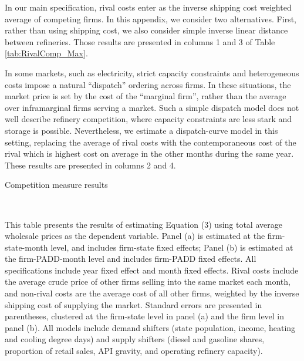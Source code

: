 \documentclass[12pt]{article}
\newcommand{\tablepath}{../output/offline/tables}
\renewcommand{\footnotesize}{\normalsize}
\begin{document}
In our main specification, rival costs enter as the inverse shipping cost weighted average of competing firms. In this appendix, we consider two alternatives. First, rather than using shipping cost, we also consider simple inverse linear distance between refineries. Those results are presented in columns 1 and 3 of Table \ref{tab:RivalComp_Max}.

In some markets, such as electricity, strict capacity constraints and heterogeneous costs impose a natural ``dispatch'' ordering across firms. In these situations, the market price is set by the cost of the ``marginal firm'', rather than the average over inframarginal firms serving a market. Such a simple dispatch model does not well describe refinery competition, where capacity constraints are less stark and storage is possible. Nevertheless, we estimate a dispatch-curve model in this setting, replacing the average of rival costs with the contemporaneous cost of the rival which is highest cost on average in the other months during the same year. These results are presented in columns 2 and 4.

\begin{sidewaystable}[h!]
  \centering
    \caption{Competition measure results \label{tab:RivalComp_Max}}
  \footnotesize
      \\
  \begin{minipage}{\linewidth}
  \scriptsize
    This table presents the results of estimating Equation (3) using total average wholesale prices as the dependent variable. Panel (a) is estimated at the firm-state-month level, and includes firm-state fixed effects; Panel (b) is estimated at the firm-PADD-month level and includes firm-PADD fixed effects. All specifications include year fixed effect and month fixed effects.  Rival costs include the average crude price of other firms selling into the same market each month, and non-rival costs are the average cost of all other firms, weighted by the inverse shipping cost of supplying the market. Standard errors are presented in parentheses, clustered at the firm-state level in panel (a) and the firm level in panel (b). All models include demand shifters (state population, income, heating and cooling degree days) and supply shifters (diesel and gasoline shares, proportion of retail sales, API gravity, and operating refinery capacity).
\end{minipage}
\end{sidewaystable}
\end{document}
